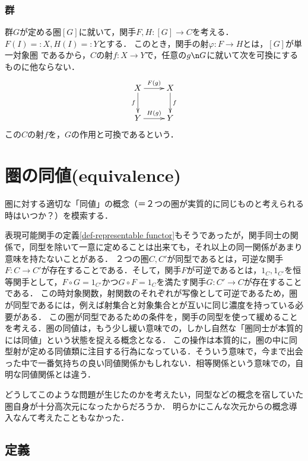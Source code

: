 \documentclass[uplatex, dvipdfmx]{jsreport}
\begin{document}
\subsection{群}

\begin{definition}[群の作用と可換]
    群$G$が定める圏$[G]$に就いて，関手$F,H:[G]\to C$を考える．$F(I)=:X,H(I)=:Y$とする．
    このとき，関手の射$\varphi:F\to H$とは，$[G]$が単一対象圏
    であるから，$C$の射$f:X\to Y$で，任意の$g\n G$に就いて次を可換にするものに他ならない．
    \[\xymatrix{
        X\ar[r]^-{F(g)}\ar[d]_-f&X\ar[d]^-f\\
        Y\ar[r]^-{H(g)}&Y
    }\]
    この$C$の射$f$を，$G$の作用と可換であるという．
\end{definition}

\chapter{圏の同値(equivalence)}

圏に対する適切な「同値」の概念（＝２つの圏が実質的に同じものと考えられる時はいつか？）を模索する．

表現可能関手の定義\ref{def-representable functor}もそうであったが，関手同士の関係で，同型を除いて一意に定めることは出来ても，それ以上の同一関係があまり意味を持たないことがある．
２つの圏$C,C'$が同型であるとは，可逆な関手$F:C\to C'$が存在することである．そして，関手$F$が可逆であるとは，$1_C,1_{C'}$を恒等関手として，$F\circ G=1_{C'}$かつ$G\circ F=1_C$を満たす関手$G:C'\to C$が存在することである．
この時対象関数，射関数のそれぞれが写像として可逆であるため，圏が同型であるには，例えば射集合と対象集合とが互いに同じ濃度を持っている必要がある．
この圏が同型であるための条件を，関手の同型を使って緩めることを考える．圏の同値は，もう少し緩い意味での，しかし自然な「圏同士が本質的には同値」という状態を捉える概念となる．
この操作は本質的に，圏の中に同型射が定める同値類に注目する行為になっている．そういう意味で，今まで出会った中で一番気持ちの良い同値関係かもしれない．相等関係という意味での，自明な同値関係とは違う．

どうしてこのような問題が生じたのかを考えたい，同型などの概念を宿していた圏自身が十分高次元になったからだろうか．
明らかにこんな次元からの概念導入なんて考えたこともなかった．

\section{定義}
\end{document}
